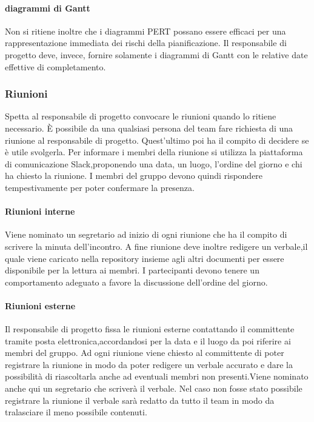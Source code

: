 \paragraph{diagrammi di Gantt} Non si ritiene inoltre che i diagrammi PERT possano essere efficaci per una rappresentazione immediata dei rischi della pianificazione. Il responsabile di progetto deve, invece, fornire solamente i diagrammi di Gantt con le relative date effettive di completamento.


\subsubsection{Riunioni}
Spetta al responsabile di progetto convocare le riunioni quando lo ritiene necessario. È possibile da una qualsiasi persona del team fare richiesta di una riunione al responsabile di progetto. Quest'ultimo poi ha il compito di decidere se è utile svolgerla. Per informare i membri della riunione si utilizza la piattaforma di comunicazione Slack,proponendo una data, un luogo, l'ordine del giorno e chi ha chiesto la riunione. I membri del gruppo devono quindi rispondere tempestivamente per poter confermare la presenza.

\paragraph{Riunioni interne} Viene nominato un segretario ad inizio di ogni riunione che ha il compito di scrivere la minuta dell'incontro. A fine riunione deve inoltre redigere un verbale,il quale viene caricato nella repository insieme agli altri documenti per essere disponibile per la lettura ai membri. I partecipanti devono tenere un comportamento adeguato a favore la discussione dell'ordine del giorno.

\paragraph{Riunioni esterne} Il responsabile di progetto fissa le riunioni esterne contattando il committente tramite posta elettronica,accordandosi per la data e il luogo da poi riferire ai membri del gruppo. Ad ogni riunione viene chiesto al committente di poter registrare la riunione in modo da poter redigere un verbale accurato e dare la possibilità di riascoltarla anche ad eventuali membri non presenti.Viene nominato anche qui un segretario che scriverà il verbale. Nel caso non fosse stato possibile registrare la riunione il verbale sarà redatto da tutto il team in modo da tralasciare il meno possibile contenuti.

